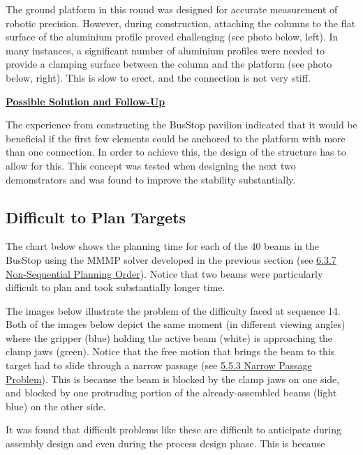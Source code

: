 {The ground platform in this round was designed for accurate measurement of robotic precision. However, during construction, attaching the columns to the flat surface of the aluminium profile proved challenging (see photo below, left). In many instances, a significant number of aluminium profiles were needed to provide a clamping surface between the column and the platform (see photo below, right). This is slow to erect, and the connection is not very stiff.




\textbf{\ul{Possible Solution and Follow-Up}}

The experience from constructing the BusStop pavilion indicated that it would be beneficial if the first few elements could be anchored to the platform with more than one connection. In order to achieve this, the design of the structure has to allow for this. This concept was tested when designing the next two demonstrators and was found to improve the stability substantially.

\subsection{Difficult to Plan Targets}

The chart below \parencite{huangNewAnalogProtocol2021} shows the planning time for each of the 40 beams in the BusStop using the MMMP solver developed in the previous section (see \ul{6.3.7 Non-Sequential Planning Order}). Notice that two beams were particularly difficult to plan and took substantially longer time. 




The images below illustrate the problem of the difficulty faced at sequence 14. Both of the images below depict the same moment (in different viewing angles) where the gripper (blue) holding the active beam (white) is approaching the clamp jaws (green). Notice that the free motion that brings the beam to this target had to slide through a narrow passage (see \ul{5.5.3 Narrow Passage Problem}). This is because the beam is blocked by the clamp jaws on one side, and blocked by one protruding portion of the already-assembled beams (light blue) on the other side.




It was found that difficult problems like these are difficult to anticipate during assembly design and even during the process design phase. This is because 

}
